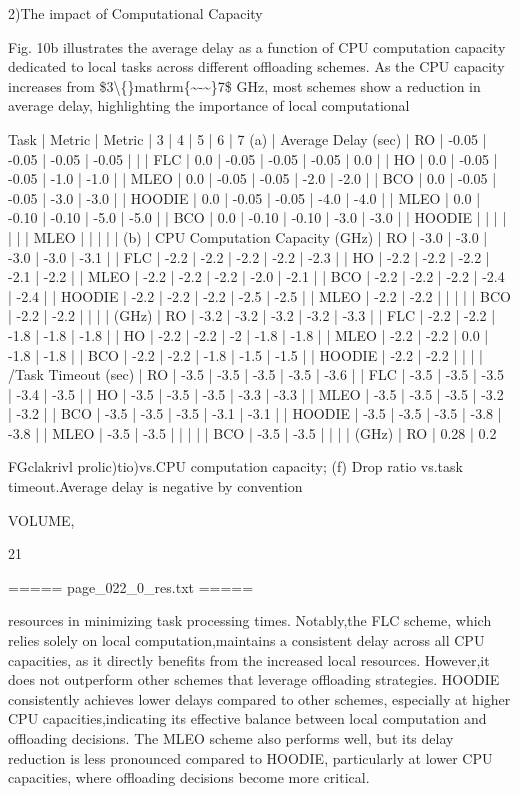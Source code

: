 \documentclass{article}
\begin{document}
2)The impact of Computational Capacity

Fig. 10b illustrates the average delay as a function of CPU computation capacity dedicated to local tasks across different offloading schemes. As the CPU capacity increases from \$3\textbackslash\{\}mathrm\{\textasciitilde{}-\textasciitilde{}\}7\$ GHz, most schemes show a reduction in average delay, highlighting the importance of local computational

Task | Metric | Metric | 3 | 4 | 5 | 6 | 7
(a) | Average Delay (sec) | RO | -0.05 | -0.05 | -0.05 | -0.05 |  
  |   | FLC | 0.0 | -0.05 | -0.05 | -0.05 | 0.0
  |   | HO | 0.0 | -0.05 | -0.05 | -1.0 | -1.0
  |   | MLEO | 0.0 | -0.05 | -0.05 | -2.0 | -2.0
  |   | BCO | 0.0 | -0.05 | -0.05 | -3.0 | -3.0
  |   | HOODIE | 0.0 | -0.05 | -0.05 | -4.0 | -4.0
  |   | MLEO | 0.0 | -0.10 | -0.10 | -5.0 | -5.0
  |   | BCO | 0.0 | -0.10 | -0.10 | -3.0 | -3.0
  |   | HOODIE |   |   |   |   |  
  |   | MLEO |   |   |   |   |  
(b) | CPU Computation Capacity (GHz) | RO | -3.0 | -3.0 | -3.0 | -3.0 | -3.1
  |   | FLC | -2.2 | -2.2 | -2.2 | -2.2 | -2.3
  |   | HO | -2.2 | -2.2 | -2.2 | -2.1 | -2.2
  |   | MLEO | -2.2 | -2.2 | -2.2 | -2.0 | -2.1
  |   | BCO | -2.2 | -2.2 | -2.2 | -2.4 | -2.4
  |   | HOODIE | -2.2 | -2.2 | -2.2 | -2.5 | -2.5
  |   | MLEO | -2.2 | -2.2 |   |   |  
  |   | BCO | -2.2 | -2.2 |   |   |  
  |   (GHz) | RO | -3.2 | -3.2 | -3.2 | -3.2 | -3.3
  |   | FLC | -2.2 | -2.2 | -1.8 | -1.8 | -1.8
  |   | HO | -2.2 | -2.2 | -2 | -1.8 | -1.8
  |   | MLEO | -2.2 | -2.2 | 0.0 | -1.8 | -1.8
  |   | BCO | -2.2 | -2.2 | -1.8 | -1.5 | -1.5
  |   | HOODIE | -2.2 | -2.2 |   |   |  
  |   /Task Timeout (sec) | RO | -3.5 | -3.5 | -3.5 | -3.5 | -3.6
  |   | FLC | -3.5 | -3.5 | -3.5 | -3.4 | -3.5
  |   | HO | -3.5 | -3.5 | -3.5 | -3.3 | -3.3
  |   | MLEO | -3.5 | -3.5 | -3.5 | -3.2 | -3.2
  |   | BCO | -3.5 | -3.5 | -3.5 | -3.1 | -3.1
  |   | HOODIE | -3.5 | -3.5 | -3.5 | -3.8 | -3.8
  |   | MLEO | -3.5 | -3.5 |   |   |  
  |   | BCO | -3.5 | -3.5 |   |   |  
  |   (GHz) | RO | 0.28 | 0.2

FGclakrivl prolic)tio)vs.CPU computation capacity; (f) Drop ratio vs.task timeout.Average delay is negative by convention

VOLUME,

21

===== page\_022\_0\_res.txt =====


resources in minimizing task processing times. Notably,the FLC scheme, which relies solely on local computation,maintains a consistent delay across all CPU capacities, as it directly benefits from the increased local resources. However,it does not outperform other schemes that leverage offloading strategies. HOODIE consistently achieves lower delays compared to other schemes, especially at higher CPU capacities,indicating its effective balance between local computation and offloading decisions. The MLEO scheme also performs well, but its delay reduction is less pronounced compared to HOODIE, particularly at lower CPU capacities, where offloading decisions become more critical.
\end{document}
